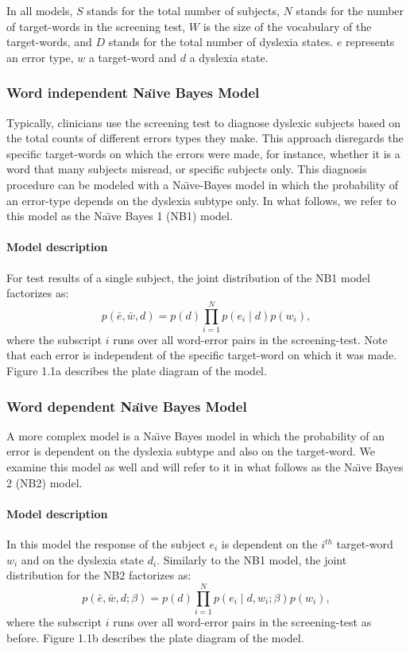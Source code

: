 {In all models, $S$ stands for the total number of subjects, $N$ stands for the number of target-words in the screening test, $W$ is the size of the vocabulary of the target-words, and $D$ stands for the total number of dyslexia states. $e$ represents an error type, $w$ a target-word and $d$ a dyslexia state.

\subsubsection{Word independent Na\"{\i}ve Bayes Model}
Typically, clinicians use the screening test to diagnose dys\-lexic subjects based on the total counts of different errors types they make. This approach disregards the specific target-words on which the errors were made, for instance, whether it is a word that many subjects misread, or specific subjects only. This diagnosis procedure can be modeled with a Na\"{\i}ve-Bayes model in which the probability of an error-type depends on the dyslexia subtype only. In what follows, we refer to this model as the Na\"{\i}ve Bayes 1 (NB1) model.

\paragraph{Model description}
For test results of a single subject, the joint distribution of the NB1 model factorizes as:
\[ p(\bar{e}, \bar{w}, d) = p(d) \prod_{i=1}^N p(e_i \mid d) p(w_i), \]
where the subscript $ i $ runs over all word-error pairs in the screening-test. Note that each error is independent of the specific target-word on which it was made. Figure 1.1a describes the plate diagram of the model.

\subsubsection{Word dependent Na\"{\i}ve Bayes Model}
A more complex model is a Na\"{\i}ve Bayes model in which the probability of an error is dependent on the dyslexia subtype and also on the target-word. We examine this model as well and will refer to it in what follows as the Na\"{\i}ve Bayes 2 (NB2) model.

\paragraph{Model description}
In this model the response of the subject $ e_i $ is dependent on the $ i^{th} $ target-word $ w_i $ and on the dyslexia state $ d_i $. Similarly to the NB1 model, the joint distribution for the NB2 factorizes as:
\[ p(\bar{e}, \bar{w}, d ; \beta) = p(d) \prod_{i=1}^N p(e_i \mid d, w_i ; \beta) p(w_i), \]
where the subscript $i$ runs over all word-error pairs in the screening-test as before. Figure 1.1b describes the plate diagram of the model.

}
